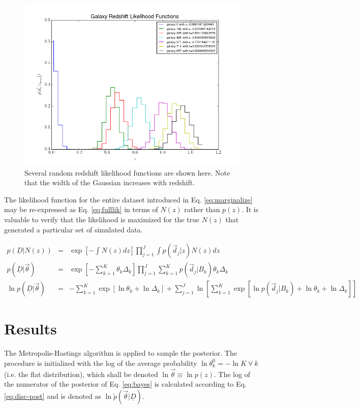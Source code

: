 \documentclass[12pt, onecolumn]{emulateapj}
\newcommand{\textul}{\underline}
\begin{document}
\begin{figure}
\label{fig:pzs}
\includegraphics[scale=0.5]{lik-samps.png}
\caption{Several random redshift likelihood functions are shown here.  Note that the width of the Gaussian increases with redshift.}
\end{figure}

The likelihood function for the entire dataset introduced in Eq. \ref{eq:marginalize} may be re-expressed as Eq. \ref{eq:fulllik} in terms of $N(z)$ rather than $p(z)$.  It is valuable to verify that the likelihood is maximized for the true $N(z)$ that generated a particular set of simulated data.

\begin{eqnarray}
\label{eq:fulllik}
p(\textul{D}|N(z)) &=& \exp\left[-\int N(z)dz\right] \prod_{j=1}^{J}\int p(\vec{d}_{j}|z)N(z)dz\\
p(\textul{D}|\vec{\theta}) &=& \exp\left[-\sum_{k=1}^{K}\theta_{k}\Delta_{k}\right] \prod_{j=1}^{J}\sum_{k=1}^{K} p(\vec{d}_{j}|B_{k})\theta_{k}\Delta_{k} \nonumber\\
\ln p(\textul{D}|\vec{\theta}) &=& -\sum_{k=1}^{K}\exp\left[\ln\theta_{k}+\ln\Delta_{k}\right]+\sum_{j=1}^{J}\ln\left[\sum_{k=1}^{K}\exp\left[\ln p(\vec{d}_{j}|B_{k})+\ln\theta_{k}+\ln\Delta_{k}\right]\right] \nonumber
\end{eqnarray}

\section{Results}

The Metropolis-Hastings algorithm is applied to sample the posterior.  The procedure is initialized with the log of the average probability $\ln\theta^{0}_{k}=-\ln K\ \forall\ k$ (i.e. the flat distribution), which shall be denoted $\ln\vec{\theta}\equiv\ln p(z)$.  The log of the numerator of the posterior of Eq. \ref{eq:bayes} is calculated according to Eq. \ref{eq:disc-post} and is denoted as $\ln\tilde{p}(\vec{\theta}|\textul{D})$.  
\end{document}
